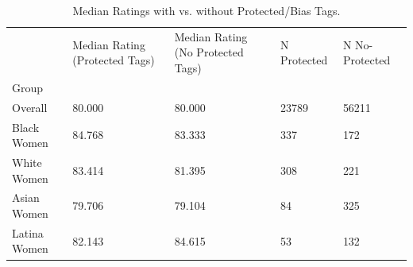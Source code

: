 \begin{table}[htbp]
\centering
\caption{Median Ratings with vs. without Protected/Bias Tags.}
\label{tab:eda_protected_rating_medians}
\begin{tabular}{lllll}
\toprule
 & Median Rating (Protected Tags) & Median Rating (No Protected Tags) & N Protected & N No-Protected \\
Group &  &  &  &  \\
\midrule
Overall & 80.000 & 80.000 & 23789 & 56211 \\
Black Women & 84.768 & 83.333 & 337 & 172 \\
White Women & 83.414 & 81.395 & 308 & 221 \\
Asian Women & 79.706 & 79.104 & 84 & 325 \\
Latina Women & 82.143 & 84.615 & 53 & 132 \\
\bottomrule
\end{tabular}

\end{table}